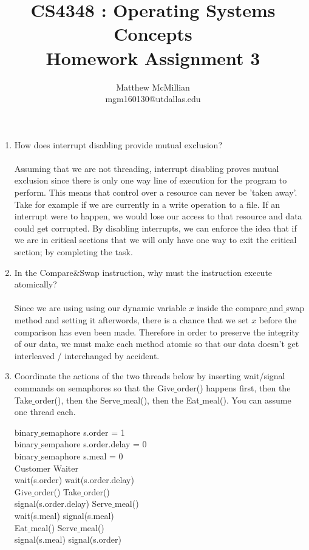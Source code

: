 \documentclass[12pt]{article}
\begin{document}
\title{CS4348 : Operating Systems Concepts\\Homework Assignment 3}
\author{Matthew McMillian\\mgm160130@utdallas.edu}
\maketitle

\begin{enumerate}

	\item How does interrupt disabling provide mutual exclusion? \\ \\
	Assuming that we are not threading, interrupt disabling proves mutual exclusion since there is only one way line of execution for the program to perform. This means that control over a resource can never be 'taken away'. Take for example if we are currently in a write operation to a file. If an interrupt were to happen, we would lose our access to that resource and data could get corrupted. By disabling interrupts, we can enforce the idea that if we are in critical sections that we will only have one way to exit the critical section; by completing the task.
	
	\item In the Compare$\&$Swap instruction, why must the instruction execute atomically? \\ \\
	Since we are using using our dynamic variable $x$ inside the compare$\_$and$\_$swap method and setting it afterwords, there is a chance that we set $x$ before the comparison has even been made. Therefore in order to preserve the integrity of our data, we must make each method atomic so that our data doesn't get interleaved / interchanged by accident.
	
	\item Coordinate the actions of the two threads below by inserting wait/signal commands on semaphores so that the Give$\_$order() happens first, then the Take$\_$order(), then the Serve$\_$meal(), then the Eat$\_$meal().  You can assume one thread each.
    \begin{center}
    binary$\_$semaphore s.order = 1 \\
    binary$\_$sempahore s.order.delay = 0 \\ 
    binary$\_$semaphore s.meal = 0 \\
     Customer  \tabto{4cm}         Waiter\\
	 wait(s.order)	\tabto{4cm}		  wait(s.order.delay) \\
     Give$\_$order() \tabto{4cm}      Take$\_$order() \\
	 signal(s.order.delay) \tabto{4cm} Serve$\_$meal()\\
	 wait(s.meal)	\tabto{4cm}		  signal(s.meal)\\
     Eat$\_$meal()   \tabto{4cm}      Serve$\_$meal()\\
	 signal(s.meal) \tabto{4cm}	      signal(s.order) \\
    \end{center}
    

\end{enumerate}
\end{document}
